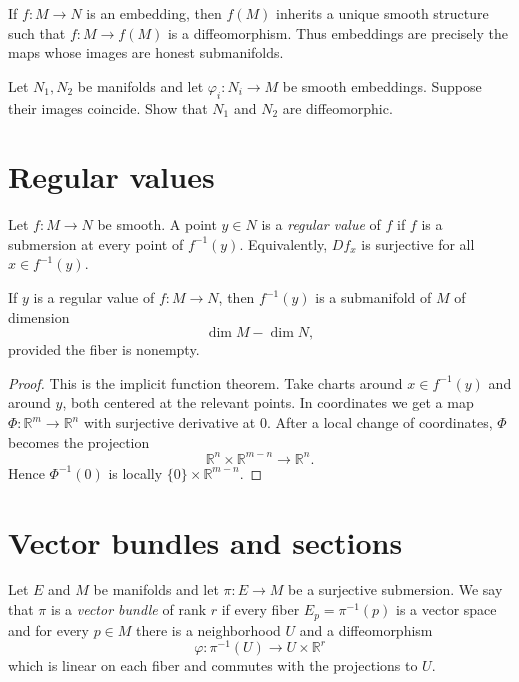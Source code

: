 \begin{remark}
\label{remark-embedding-submanifold}
If $f:M\to N$ is an embedding, then $f(M)$
inherits a unique smooth structure such that
$f:M\to f(M)$ is a diffeomorphism.  Thus
embeddings are precisely the maps whose
images are honest submanifolds.
\end{remark}

\begin{exercise}
\label{exercise-same-embedded-image}
Let $N_1,N_2$ be manifolds and let
$\varphi_i:N_i\to M$ be smooth embeddings.
Suppose their images coincide.  Show that
$N_1$ and $N_2$ are diffeomorphic.
\end{exercise}

\section{Regular values}
\label{section-regular-values}

\begin{definition}
\label{definition-regular-value}
Let $f:M\to N$ be smooth.  A point $y\in N$
is a {\it regular value} of $f$ if $f$ is a
submersion at every point of $f^{-1}(y)$.
Equivalently, $Df_x$ is surjective for all
$x\in f^{-1}(y)$.
\end{definition}

\begin{theorem}
\label{theorem-regular-value}
If $y$ is a regular value of $f:M\to N$, then
$f^{-1}(y)$ is a submanifold of $M$ of
dimension
$$
\dim M-\dim N,
$$
provided the fiber is nonempty.
\end{theorem}

\begin{proof}
This is the implicit function theorem.  Take
charts around $x\in f^{-1}(y)$ and around
$y$, both centered at the relevant points.
In coordinates we get a map
$\Phi:\mathbb R^m\to\mathbb R^n$ with
surjective derivative at $0$.  After a local
change of coordinates, $\Phi$ becomes the
projection
$$
\mathbb R^n\times \mathbb R^{m-n}
\longrightarrow \mathbb R^n.
$$
Hence $\Phi^{-1}(0)$ is locally
$\{0\}\times \mathbb R^{m-n}$.
\end{proof}

\section{Vector bundles and sections}
\label{section-vector-bundles-sections}

\begin{definition}
\label{definition-vector-bundle}
Let $E$ and $M$ be manifolds and let
$\pi:E\to M$ be a surjective submersion.
We say that $\pi$ is a {\it vector bundle} of
rank $r$ if every fiber
$E_p=\pi^{-1}(p)$ is a vector space and for
every $p\in M$ there is a neighborhood $U$
and a diffeomorphism
$$
\varphi:\pi^{-1}(U)\to U\times\mathbb R^r
$$
which is linear on each fiber and commutes
with the projections to $U$.
\end{definition}

